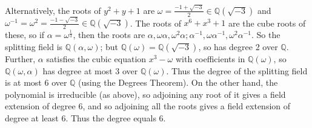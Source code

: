 \documentclass{amsart}
\newcommand{\Q}         {{\mathbb{Q}}}
\newcommand{\al}        {\alpha}
\newcommand{\om}        {\omega}
\renewcommand{\:}{\colon}
\newenvironment{solution}{\SolutionInline}{\endSolutionInline}
\theoremstyle{definition}
\renewenvironment{solution}{\SolutionAtEnd}{\endSolutionAtEnd}
\begin{document}
\begin{solution}
\begin{itemize}
   Alternatively, the roots of $y^2+y+1$ are
   $\om=\frac{-1+\sqrt{-3}}{2}\in\Q(\sqrt{-3})$ and
   $\om^{-1}=\om^2=\frac{-1-\sqrt{-3}}{2}\in\Q(\sqrt{-3})$.  The roots
   of $x^6+x^3+1$ are the cube roots of these, so if
   $\al=\om^{\frac{1}{3}}$, then the roots are
   $\al,\om\al,\om^2\al;\al^{-1},\om\al^{-1},\om^2\al^{-1}$. So the
   splitting field is $\Q(\al,\om)$; but $\Q(\om)=\Q(\sqrt{-3})$, so
   has degree 2 over $\Q$. Further, $\al$ satisfies the cubic equation
   $x^3-\om$ with coefficients in $\Q(\om)$, so $\Q(\om,\al)$ has
   degree at most 3 over $\Q(\om)$. Thus the degree of the splitting
   field is at most 6 over $\Q$ (using the Degrees Theorem). On the
   other hand, the polynomial is irreducible (as above), so adjoining
   any root of it gives a field extension of degree 6, and so
   adjoining all the roots gives a field extension of degree at least
   6. Thus the degree equals 6.
 \end{itemize}
\end{solution}
\end{document}
